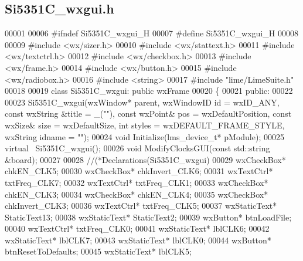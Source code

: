 \subsection{Si5351\+C\+\_\+wxgui.\+h}
\label{Si5351C__wxgui_8h_source}

\begin{DoxyCode}
00001 
00006 \textcolor{preprocessor}{#ifndef Si5351C\_wxgui\_H}
00007 \textcolor{preprocessor}{#define Si5351C\_wxgui\_H}
00008 
00009 \textcolor{preprocessor}{#include <wx/sizer.h>}
00010 \textcolor{preprocessor}{#include <wx/stattext.h>}
00011 \textcolor{preprocessor}{#include <wx/textctrl.h>}
00012 \textcolor{preprocessor}{#include <wx/checkbox.h>}
00013 \textcolor{preprocessor}{#include <wx/frame.h>}
00014 \textcolor{preprocessor}{#include <wx/button.h>}
00015 \textcolor{preprocessor}{#include <wx/radiobox.h>}
00016 \textcolor{preprocessor}{#include <string>}
00017 \textcolor{preprocessor}{#include "lime/LimeSuite.h"}
00018 
00019 \textcolor{keyword}{class }Si5351C_wxgui: \textcolor{keyword}{public} wxFrame
00020 \{
00021 \textcolor{keyword}{public}:
00022 
00023     Si5351C_wxgui(wxWindow* parent, wxWindowID \textcolor{keywordtype}{id} = wxID\_ANY, \textcolor{keyword}{const} wxString &title = \_(\textcolor{stringliteral}{""}), \textcolor{keyword}{const} wxPoint&
       pos = wxDefaultPosition, \textcolor{keyword}{const} wxSize& size = wxDefaultSize, \textcolor{keywordtype}{int} styles = wxDEFAULT\_FRAME\_STYLE, wxString 
      idname = \textcolor{stringliteral}{""});
00024     \textcolor{keywordtype}{void} Initialize(lms_device_t* pModule);
00025     \textcolor{keyword}{virtual} ~Si5351C_wxgui();
00026     \textcolor{keywordtype}{void} ModifyClocksGUI(\textcolor{keyword}{const} std::string &board);
00027 
00028     \textcolor{comment}{//(*Declarations(Si5351C\_wxgui)}
00029     wxCheckBox* chkEN_CLK5;
00030     wxCheckBox* chkInvert_CLK6;
00031     wxTextCtrl* txtFreq_CLK7;
00032     wxTextCtrl* txtFreq_CLK1;
00033     wxCheckBox* chkEN_CLK3;
00034     wxCheckBox* chkEN_CLK4;
00035     wxCheckBox* chkInvert_CLK3;
00036     wxTextCtrl* txtFreq_CLK5;
00037     wxStaticText* StaticText13;
00038     wxStaticText* StaticText2;
00039     wxButton* btnLoadFile;
00040     wxTextCtrl* txtFreq_CLK0;
00041     wxStaticText* lblCLK6;
00042     wxStaticText* lblCLK7;
00043     wxStaticText* lblCLK0;
00044     wxButton* btnResetToDefaults;
00045     wxStaticText* lblCLK5;

\end{DoxyCode}
